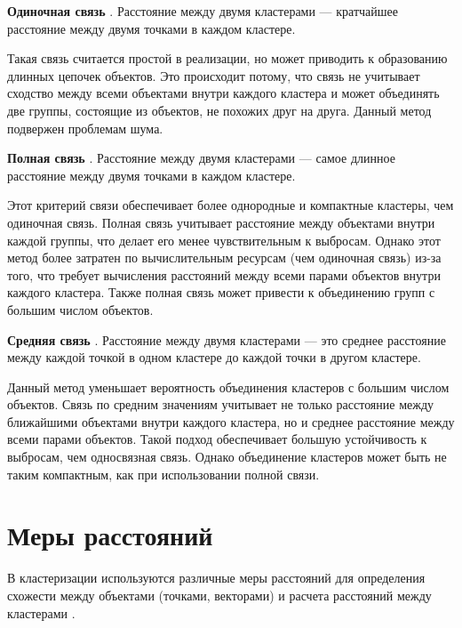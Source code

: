 
\textbf{Одиночная связь} \cite{SingleLink}. Расстояние между двумя кластерами --- кратчайшее расстояние между двумя точками в каждом кластере.

Такая связь считается простой в реализации, но может приводить к образованию длинных цепочек объектов. Это происходит потому, что связь не учитывает сходство между всеми объектами внутри каждого кластера и может объединять две группы, состоящие из объектов, не похожих друг на друга. Данный метод подвержен проблемам шума. 

\textbf{Полная связь} \cite{CompleteLink}. Расстояние между двумя кластерами --- самое длинное расстояние между двумя точками в каждом кластере.

Этот критерий связи обеспечивает более однородные и компактные кластеры, чем одиночная связь.
Полная связь учитывает расстояние между объектами внутри каждой группы, что делает его менее чувствительным к выбросам. Однако этот метод более затратен по вычислительным ресурсам (чем одиночная связь) из-за того, что требует вычисления расстояний между всеми парами объектов внутри каждого кластера. Также полная связь может привести к объединению групп с большим числом объектов.

\textbf{Средняя связь} \cite{AverageLink}. Расстояние между двумя кластерами --- это среднее расстояние между каждой точкой в одном кластере до каждой точки в другом кластере.

Данный метод уменьшает вероятность объединения кластеров с большим числом объектов. Связь по средним значениям учитывает не только расстояние между ближайшими объектами внутри каждого кластера, но и среднее расстояние между всеми парами объектов. Такой подход обеспечивает большую устойчивость к выбросам, чем односвязная связь. Однако объединение кластеров может быть не таким компактным, как при использовании полной связи.



\section{Меры расстояний}

В кластеризации используются различные меры расстояний для определения схожести между объектами (точками, векторами) и расчета расстояний между кластерами \cite{AnalysisСlusteringAlgorithms}.

